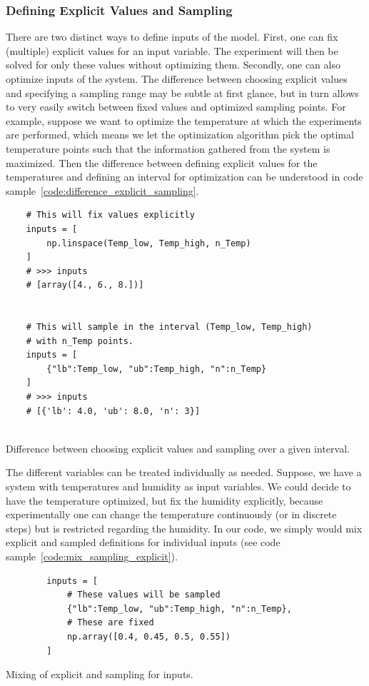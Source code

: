 \documentclass[10pt,A4paper]{article}
\begin{document}
\subsubsection*{Defining Explicit Values and Sampling}
There are two distinct ways to define inputs of the model.
First, one can fix (multiple) explicit values for an input variable.
The experiment will then be solved for only these values without optimizing them.
Secondly, one can also optimize inputs of the system.
The difference between choosing explicit values and specifying a sampling range may be subtle at first glance, but in turn allows to very easily switch between fixed values and optimized sampling points.
For example, suppose we want to optimize the temperature at which the experiments are performed, which means we let the optimization algorithm pick the optimal temperature points such that the information gathered from the system is maximized.
Then the difference between defining explicit values for the temperatures and defining an interval for optimization can be understood in code sample~\ref{code:difference_explicit_sampling}.\newline
\begin{code}[h]
    \begin{verbatim}
    # This will fix values explicitly
    inputs = [
        np.linspace(Temp_low, Temp_high, n_Temp)
    ]
    # >>> inputs
    # [array([4., 6., 8.])]


    # This will sample in the interval (Temp_low, Temp_high)
    # with n_Temp points.
    inputs = [
        {"lb":Temp_low, "ub":Temp_high, "n":n_Temp}
    ]
    # >>> inputs
    # [{'lb': 4.0, 'ub': 8.0, 'n': 3}]


    \end{verbatim}
    \caption{Difference between choosing explicit values and sampling over a given interval.}
    \label{code:difference_explicit_sampling}
\end{code}%
The different variables can be treated individually as needed.
Suppose, we have a system with temperatures and humidity as input variables.
We could decide to have the temperature optimized, but fix the humidity explicitly, because experimentally one can change the temperature continuously (or in discrete steps) but is restricted regarding the humidity.
In our code, we simply would mix explicit and sampled definitions for individual inputs (see code sample~\ref{code:mix_sampling_explicit}).
\begin{code}[h]
    \begin{verbatim}
        inputs = [
            # These values will be sampled
            {"lb":Temp_low, "ub":Temp_high, "n":n_Temp},
            # These are fixed
            np.array([0.4, 0.45, 0.5, 0.55])
        ]
    \end{verbatim}
    \caption{Mixing of explicit and sampling for inputs.}
    \label{code:mix_sampling_explicit}
\end{code}
%
\end{document}
